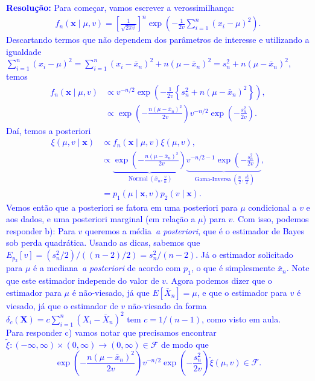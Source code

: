 \documentclass[a4paper,10pt, notitlepage]{report}
\newcommand{\bX}{\boldsymbol{X}} %
\begin{document}
\textcolor{blue}{
\textbf{Resolução:}
Para começar, vamos escrever a verossimilhança:
\begin{align*}
 f_n(\boldsymbol{x} \mid \mu, v) = \left[\frac{1}{\sqrt{2\pi v}}\right]^n \exp\left(-\frac{1}{2v}\sum_{i=1}^n (x_i -\mu)^2\right).
\end{align*}
Descartando termos que não dependem dos parâmetros de interesse e utilizando a igualdade $\sum_{i=1}^n (x_i -\mu)^2 = \sum_{i=1}^n (x_i -\bar{x}_n)^2 + n(\mu-\bar{x}_n)^2 = s_n^2 + n(\mu-\bar{x}_n)^2$, temos
\begin{align*}
 f_n(\boldsymbol{x} \mid \mu, v) &\propto v^{-n/2} \exp\left(-\frac{1}{2v} \left\{ s_n^2 + n(\mu-\bar{x}_n)^2 \right\}\right),\\
 &\propto \exp\left(-\frac{n(\mu-\bar{x}_n)^2}{2v}\right)v^{-n/2} \exp\left(-\frac{s_n^2}{2v}\right).
\end{align*}
Daí, temos a posteriori
\begin{align}
\nonumber
 \xi(\mu, v \mid \boldsymbol{x}) &\propto f_n(\boldsymbol{x} \mid \mu, v)\xi(\mu, v),\\
 \label{eq:nig_post}
 &\propto \underbrace{\exp\left(-\frac{n(\mu-\bar{x}_n)^2}{2v}\right)}_{\operatorname{Normal}(\bar{x}_n, \frac{v}{n})}\underbrace{v^{-n/2-1} \exp\left(-\frac{s_n^2}{2v}\right)}_{\operatorname{Gama-Inversa}(\frac{n}{2}, \frac{s_n^2}{2})},\\
 \nonumber
 &= p_1(\mu \mid \boldsymbol{x}, v)p_2(v \mid \boldsymbol{x}).
\end{align}
Vemos então que a posteriori se fatora em uma posteriori para $\mu$ condicional a $v$ e aos dados, e uma posteriori marginal (em relação a $\mu$) para $v$.
Com isso, podemos responder b): Para $v$ queremos a média~\textit{a posteriori}, que é o estimador de Bayes sob perda quadrática.
Usando as dicas, sabemos que $E_{p_2}[v] = (s_n^2/2)/((n-2)/2) = s_n^2/(n-2)$.
Já o estimador solicitado para $\mu$ é a mediana~\textit{a posteriori} de acordo com $p_1$, o que é simplesmente $\bar{x}_n$.
Note que este estimador independe do valor de $v$.
Agora podemos dizer que o estimador para $\mu$ é não-viesado, já que $E[\bar{X}_n] = \mu$, e que o estimador para $v$ é viesado, já que o estimador de $v$ não-viesado da forma $\delta_c(\bX) = c \sum_{i=1}^n (X_i -\bar{X}_n)^2$ tem $c = 1/(n-1)$, como visto em aula.
\\
Para responder c) vamos notar que precisamos encontrar $\tilde{\xi}: (-\infty, \infty)\times (0, \infty) \to (0, \infty) \in \mathcal{F}$ de modo que
$$
\exp\left(-\frac{n(\mu-\bar{x}_n)^2}{2v}\right)v^{-n/2} \exp\left(-\frac{s_n^2}{2v}\right)\tilde{\xi}(\mu, v) \in \mathcal{F}.
$$}
\end{document}
